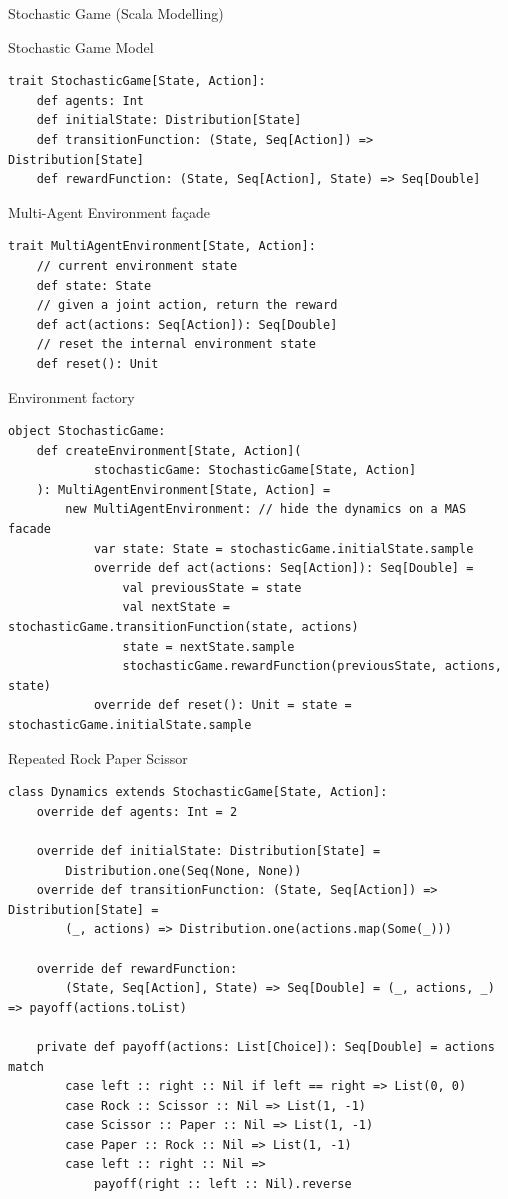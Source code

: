 \documentclass[presentation, 8pt]{beamer}\mode<presentation>{\usetheme{AMSBolognaFC}}
\begin{document}
\begin{frame}{Stochastic Game (Scala Modelling)}
\begin{exampleblock}{Stochastic Game Model}
\begin{lstlisting}[style=scala]
trait StochasticGame[State, Action]:
	def agents: Int 
	def initialState: Distribution[State]
	def transitionFunction: (State, Seq[Action]) => Distribution[State]
	def rewardFunction: (State, Seq[Action], State) => Seq[Double]
\end{lstlisting}	
\end{exampleblock}
\begin{exampleblock}{Multi-Agent Environment façade}
	\begin{lstlisting}[style=scala]
trait MultiAgentEnvironment[State, Action]:
	// current environment state
	def state: State
	// given a joint action, return the reward
	def act(actions: Seq[Action]): Seq[Double]
	// reset the internal environment state 
	def reset(): Unit 
\end{lstlisting}	
\end{exampleblock}
\begin{exampleblock}{Environment factory}
\begin{lstlisting}[style=scala]
object StochasticGame:
	def createEnvironment[State, Action](
			stochasticGame: StochasticGame[State, Action]
	): MultiAgentEnvironment[State, Action] =
		new MultiAgentEnvironment: // hide the dynamics on a MAS facade
			var state: State = stochasticGame.initialState.sample
			override def act(actions: Seq[Action]): Seq[Double] =
				val previousState = state
				val nextState = stochasticGame.transitionFunction(state, actions)
				state = nextState.sample
				stochasticGame.rewardFunction(previousState, actions, state)
			override def reset(): Unit = state = stochasticGame.initialState.sample
\end{lstlisting}
\end{exampleblock}
\begin{exampleblock}{Repeated Rock Paper Scissor}
\begin{lstlisting}[style=scala]
class Dynamics extends StochasticGame[State, Action]:
	override def agents: Int = 2

	override def initialState: Distribution[State] =
		Distribution.one(Seq(None, None))
	override def transitionFunction: (State, Seq[Action]) => Distribution[State] =
		(_, actions) => Distribution.one(actions.map(Some(_)))

	override def rewardFunction: 
		(State, Seq[Action], State) => Seq[Double] = (_, actions, _) => payoff(actions.toList)

	private def payoff(actions: List[Choice]): Seq[Double] = actions match
		case left :: right :: Nil if left == right => List(0, 0)
		case Rock :: Scissor :: Nil => List(1, -1)
		case Scissor :: Paper :: Nil => List(1, -1)
		case Paper :: Rock :: Nil => List(1, -1)
		case left :: right :: Nil =>
			payoff(right :: left :: Nil).reverse
\end{lstlisting}
\end{exampleblock}
\end{frame}
\end{document}

